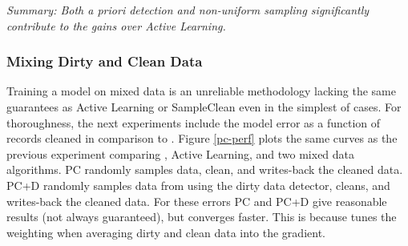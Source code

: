 \vspace{0.25em}

\noindent \emph{Summary: Both a priori detection and non-uniform sampling significantly contribute to the gains over Active Learning.}

\subsubsection{Mixing Dirty and Clean Data}
Training a model on mixed data is an unreliable methodology lacking the same guarantees as Active Learning or SampleClean even in the simplest of cases.
For thoroughness, the next experiments include the model error as a function of records cleaned in comparison to \sys.
Figure \ref{pc-perf} plots the same curves as the previous experiment comparing \sys, Active Learning, and two mixed data algorithms.
PC randomly samples data, clean, and writes-back the cleaned data.
PC+D randomly samples data from using the dirty data detector, cleans, and writes-back the cleaned data.
For these errors PC and PC+D give reasonable results (not always guaranteed), but \sys converges faster.
This is because \sys tunes the weighting when averaging dirty and clean data into the gradient.

